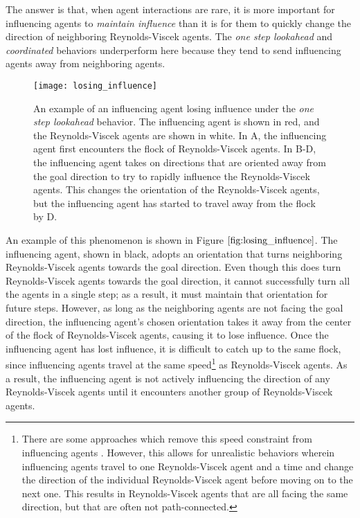 The answer is that, when agent interactions are rare, it is more important for
influencing agents to \textit{maintain influence} than it is for them to quickly
change the direction of neighboring Reynolds-Viscek agents.
The \textit{one step lookahead} and \textit{coordinated} behaviors underperform
here because they tend to send influencing agents away from neighboring agents.
\begin{figure}
    \texttt{[image: losing\_influence]}
    \caption{An example of an influencing agent losing influence under the
    \textit{one step lookahead} behavior.
    The influencing agent is shown in red, and the Reynolds-Viscek agents are
    shown in white.
    In A, the influencing agent first encounters the flock of Reynolds-Viscek
    agents.
    In B-D, the influencing agent takes on directions that are oriented away
    from the goal direction to try to rapidly influence the Reynolds-Viscek
    agents.
    This changes the orientation of the Reynolds-Viscek agents, but the
    influencing agent has started to travel away from the flock by D.}
    \label{fig:losing_influence}
\end{figure}
An example of this phenomenon is shown in Figure $\ref{fig:losing_influence}$.
The influencing agent, shown in black, adopts an orientation that turns
neighboring Reynolds-Viscek agents towards the goal direction.
Even though this does turn Reynolds-Viscek agents towards the goal direction, it cannot
successfully turn all the agents in a single step; as a result, it must maintain
that orientation for future steps.
However, as long as the neighboring agents are not facing the goal direction,
the influencing agent's chosen orientation takes it away from the center of the
flock of Reynolds-Viscek agents, causing it to lose influence.
Once the influencing agent has lost influence, it is difficult to catch up to the
same flock, since influencing agents travel at the same speed\footnote{
There are some approaches which remove this speed constraint from
influencing agents \cite{han2010teleporting}.
However, this allows for unrealistic behaviors wherein influencing agents travel
to one Reynolds-Viscek agent and a time and change the direction of the
individual Reynolds-Viscek agent before moving on to the next one.
This results in Reynolds-Viscek agents that are all facing the same direction,
but that are often not path-connected.}
as Reynolds-Viscek agents.
As a result, the influencing agent is not actively influencing the direction of
any Reynolds-Viscek agents until it encounters another group of Reynolds-Viscek
agents.

